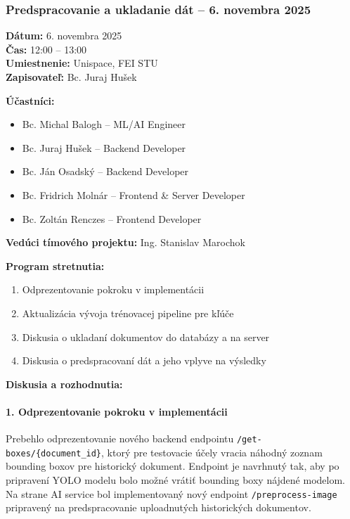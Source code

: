 \subsubsection{Predspracovanie a ukladanie dát – 6. novembra 2025}

\textbf{Dátum:} 6. novembra 2025 \\
\textbf{Čas:} 12:00 – 13:00 \\
\textbf{Umiestnenie:} Unispace, FEI STU \\
\textbf{Zapisovateľ:} Bc. Juraj Hušek

\vspace{0.5cm}
\textbf{Účastníci:}
\begin{itemize}
    \item Bc. Michal Balogh – ML/AI Engineer
    \item Bc. Juraj Hušek – Backend Developer
    \item Bc. Ján Osadský – Backend Developer
    \item Bc. Fridrich Molnár – Frontend \& Server Developer
    \item Bc. Zoltán Renczes – Frontend Developer
\end{itemize}

\textbf{Vedúci tímového projektu:} Ing. Stanislav Marochok

\vspace{0.5cm}
\textbf{Program stretnutia:}
\begin{enumerate}
    \item Odprezentovanie pokroku v implementácii
    \item Aktualizácia vývoja trénovacej pipeline pre kľúče
    \item Diskusia o ukladaní dokumentov do databázy a na server
    \item Diskusia o predspracovaní dát a jeho vplyve na výsledky
\end{enumerate}

\vspace{0.5cm}
\textbf{Diskusia a rozhodnutia:}

\paragraph{1. Odprezentovanie pokroku v implementácii}
Prebehlo odprezentovanie nového backend endpointu \texttt{/get-boxes/\{document\_id\}}, ktorý pre testovacie účely vracia náhodný zoznam bounding boxov pre historický dokument. Endpoint je navrhnutý tak, aby po pripravení YOLO modelu bolo možné vrátiť bounding boxy nájdené modelom. Na strane AI service bol implementovaný nový endpoint \texttt{/preprocess-image} pripravený na predspracovanie uploadnutých historických dokumentov.

